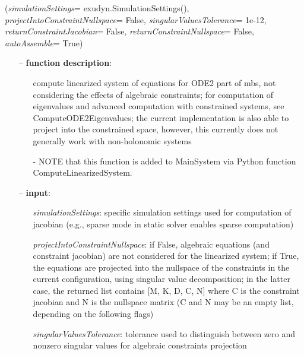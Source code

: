 %
\begin{flushleft}
\label{sec:mainsystemextensions:ComputeLinearizedSystem}
({\it simulationSettings}= exudyn.SimulationSettings(), {\it projectIntoConstraintNullspace}= False, {\it singularValuesTolerance}= 1e-12, {\it returnConstraintJacobian}= False, {\it returnConstraintNullspace}= False, {\it autoAssemble}= True)
\end{flushleft}
\setlength{\itemindent}{0.7cm}
\begin{itemize}[leftmargin=0.7cm]
\item[--]
{\bf function description}: \vspace{-6pt}
\begin{itemize}[leftmargin=1.2cm]
\setlength{\itemindent}{-0.7cm}
\item[]compute linearized system of equations for ODE2 part of mbs, not considering the effects of algebraic constraints; for computation of eigenvalues and advanced computation with constrained systems, see ComputeODE2Eigenvalues; the current implementation is also able to project into the constrained space, however, this currently does not generally work with non-holonomic systems
\item[]- NOTE that this function is added to MainSystem via Python function ComputeLinearizedSystem.
\end{itemize}
\item[--]
{\bf input}: \vspace{-6pt}
\begin{itemize}[leftmargin=1.2cm]
\setlength{\itemindent}{-0.7cm}
\item[]{\it simulationSettings}: specific simulation settings used for computation of jacobian (e.g., sparse mode in static solver enables sparse computation)
\item[]{\it projectIntoConstraintNullspace}: if False, algebraic equations (and constraint jacobian) are not considered for the linearized system; if True, the equations are projected into the nullspace of the constraints in the current configuration, using singular value decomposition; in the latter case, the returned list contains [M, K, D, C, N] where C is the constraint jacobian and N is the nullspace matrix (C and N may be an empty list, depending on the following flags)
\item[]{\it singularValuesTolerance}: tolerance used to distinguish between zero and nonzero singular values for algebraic constraints projection

\end{itemize}
\end{itemize}
